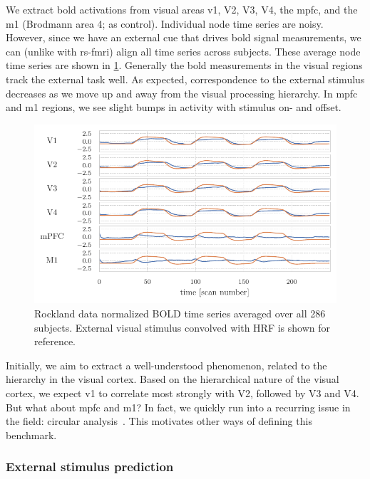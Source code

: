 We extract \gls{bold} activations from visual areas \gls{v1}, V2, V3, V4, the \gls{mpfc}, and the \gls{m1} (Brodmann area 4; as control).
%
Individual node time series are noisy.
However, since we have an external cue that drives \gls{bold} signal measurements, we can (unlike with \gls{rs-fmri}) align all time series across subjects.
These average node time series are shown in \cref{fig:rockland-time-series-mean-over-subjects}.
Generally the \gls{bold} measurements in the visual regions track the external task well.
As expected, correspondence to the external stimulus decreases as we move up and away from the visual processing hierarchy.
In \gls{mpfc} and \gls{m1} regions, we see slight bumps in activity with stimulus on- and offset.


\begin{figure}[t]
  \centering
  \includegraphics[width=\textwidth]{fig/rockland/CHECKERBOARD645/node_timeseries/mean_over_subjects}
  \caption{
    Rockland data normalized BOLD time series averaged over all 286 subjects.
    External visual stimulus convolved with HRF is shown for reference.
  }
  \label{fig:rockland-time-series-mean-over-subjects}
\end{figure}


Initially, we aim to extract a well-understood phenomenon, related to the hierarchy in the visual cortex.
Based on the hierarchical nature of the visual cortex, we expect \gls{v1} to correlate most strongly with V2, followed by V3 and V4.
But what about \gls{mpfc} and \gls{m1}?
In fact, we quickly run into a recurring issue in the field: circular analysis~\parencite{Kerr1998, Kriegeskorte2009, Kriegeskorte2010, Poldrack2012, Poldrack2017}.
This motivates other ways of defining this benchmark.

\subsubsection{External stimulus prediction}


